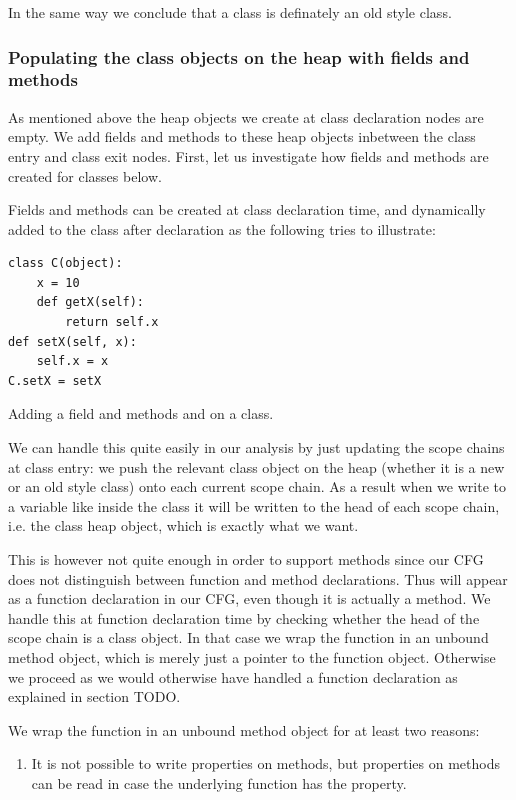 In the same way we conclude that a class is definately an old style class.

\subsubsection{Populating the class objects on the heap with fields and methods}
As mentioned above the heap objects we create at class declaration nodes are empty. We add fields and methods to these heap objects inbetween the class entry and class exit nodes. First, let us investigate how fields and methods are created for classes below.

Fields and methods can be created at class declaration time, and dynamically added to the class after declaration as the following tries to illustrate:

\begin{listing}[H]
	\begin{verbatim}
class C(object):
	x = 10
	def getX(self):
		return self.x
def setX(self, x):
	self.x = x
C.setX = setX
	\end{verbatim}
	\caption{Adding a field  and methods  and  on a class.}\label{code:FieldAndMethodOnClass}
\end{listing}

We can handle this quite easily in our analysis by just updating the scope chains at class entry: we push the relevant class object on the heap (whether it is a new or an old style class) onto each current scope chain. As a result when we write to a variable like  inside the class it will be written to the head of each scope chain, i.e. the class heap object, which is exactly what we want.

This is however not quite enough in order to support methods since our CFG does not distinguish between function and method declarations. Thus  will appear as a function declaration in our CFG, even though it is actually a method. We handle this at function declaration time by checking whether the head of the scope chain is a class object. In that case we wrap the function in an unbound method object, which is merely just a pointer to the function object. Otherwise we proceed as we would otherwise have handled a function declaration as explained in section TODO.

We wrap the function in an unbound method object for at least two reasons:

\begin{enumerate}
	\item It is not possible to write properties on methods, but properties on methods can be read in case the underlying function has the property.
\end{enumerate}

